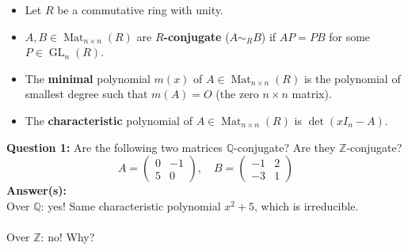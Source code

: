 \documentclass[aspectratio=169,usenames,dvipsnames]{beamer}
\def\Q{\mathbb{Q}}
\def\Z{\mathbb{Z}}
\DeclareMathOperator{\Mat}{Mat}
\DeclareMathOperator{\GL}{GL}
\begin{document}
\begin{frame}{}
\begin{columns}
\begin{column}{0.5\textwidth}
\begin{center}
           \end{center}
      \end{column}
   \end{columns}
\end{frame}

\begin{frame}{}
   \begin{itemize}
      \item Let $R$ be a commutative ring with unity.
      \item $A,B \in \Mat_{n\times n}(R)$ are {\bf $R$-conjugate} ($A\sim_R B$) if $AP=PB$ for some $P\in \GL_n(R)$.
      \item The {\bf minimal} polynomial $m(x)$ of $A \in \Mat_{n\times n}(R)$ is the polynomial of smallest degree such that $m(A) = O$ (the zero $n\times n$ matrix).
      \item The {\bf characteristic} polynomial of $A \in \Mat_{n\times n}(R)$ is $\det(xI_n-A)$.
   \end{itemize}
   \pause 
   {\bf Question 1:} 
   Are the following two matrices $\Q$-conjugate? Are they $\Z$-conjugate?
   \[
   A=\begin{pmatrix}
      0 & -1 \\ 5 & 0
   \end{pmatrix}, \quad
   B=\begin{pmatrix}
      -1 & 2 \\ -3 & 1
   \end{pmatrix}
   \]
   \pause
   {\bf Answer(s):}\\ 
   \pause Over $\Q$: yes! Same characteristic polynomial $x^2+5$, which is irreducible.\\
   \\    
   \pause Over $\Z$: no! Why?
\end{frame}
\end{document}
